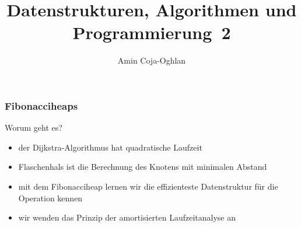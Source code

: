 \documentclass[aspectratio=1610, 11pt]{beamer}
\title{Datenstrukturen, Algorithmen und Programmierung~2}
\author[A.~Coja-Oghlan]{Amin Coja-Oghlan}
\institute[DAP2]{Lehrstuhl Informatik 2\\Fakult\"at f\"ur Informatik}
\newcommand{\mytitle}{Fibonacciheaps}
\begin{document}
\frame[plain]{\titlepage}

\begin{frame}\frametitle{\mytitle}
	\begin{exampleblock}{Worum geht es?}
		\begin{itemize}
			\item der Dijkstra-Algorithmus hat quadratische Laufzeit
			\item Flaschenhals ist die Berechnung des Knotens mit minimalen Abstand
			\item mit dem Fibonacciheap lernen wir die effizienteste Datenstruktur f\"ur die Operation kennen
			\item wir wenden das Prinzip der \alert{amortisierten Laufzeitanalyse} an
		\end{itemize}
	\end{exampleblock}
\end{frame}
\end{document}
